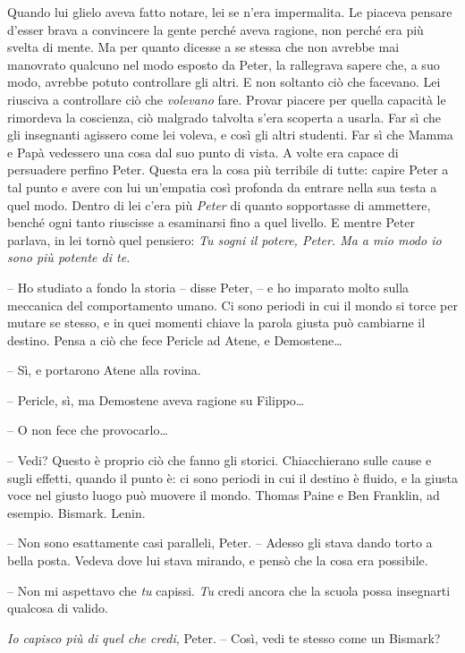 {Quando lui glielo aveva fatto notare, lei se n'era impermalita. Le
	piaceva pensare d'esser brava a convincere la gente perché aveva
	ragione, non perché era più svelta di mente. Ma per quanto dicesse a se
	stessa che non avrebbe mai manovrato qualcuno nel modo esposto da Peter,
	la rallegrava sapere che, a suo modo, avrebbe potuto controllare gli
	altri. E non soltanto ciò che facevano. Lei riusciva a controllare ciò
	che \emph{volevano} fare. Provar piacere per quella capacità le
	rimordeva la coscienza, ciò malgrado talvolta s'era scoperta a usarla.
	Far sì che gli insegnanti agissero come lei voleva, e così gli altri
	studenti. Far sì che Mamma e Papà vedessero una cosa dal suo punto di
	vista. A volte era capace di persuadere perfino Peter. Questa era la
	cosa più terribile di tutte: capire Peter a tal punto e avere con lui
	un'empatia così profonda da entrare nella sua testa a quel modo. Dentro
	di lei c'era più \emph{Peter} di quanto sopportasse di ammettere, benché
	ogni tanto riuscisse a esaminarsi fino a quel livello. E mentre Peter
	parlava, in lei tornò quel pensiero: \emph{Tu sogni il potere, Peter. Ma
		a mio modo io sono più potente di te.}}

{-- Ho studiato a fondo la storia -- disse Peter, -- e ho imparato molto
	sulla meccanica del comportamento umano. Ci sono periodi in cui il mondo
	si torce per mutare se stesso, e in quei momenti chiave la parola giusta
	può cambiarne il destino. Pensa a ciò che fece Pericle ad Atene, e
	Demostene\ldots{}}

{-- Sì, e portarono Atene alla rovina.}

{-- Pericle, sì, ma Demostene aveva ragione su Filippo\ldots{}}

{-- O non fece che provocarlo\ldots{}}

{-- Vedi? Questo è proprio ciò che fanno gli storici. Chiacchierano
	sulle cause e sugli effetti, quando il punto è: ci sono periodi in cui
	il destino è fluido, e la giusta voce nel giusto luogo può muovere il
	mondo. Thomas Paine e Ben Franklin, ad esempio. Bismark. Lenin.}

{-- Non sono esattamente casi paralleli, Peter. -- Adesso gli stava
	dando torto a bella posta. Vedeva dove lui stava mirando, e pensò che la
	cosa era possibile.}

{-- Non mi aspettavo che \emph{tu} capissi. \emph{Tu} credi ancora che
	la scuola possa insegnarti qualcosa di valido.}

\emph{{Io capisco più di quel che credi}}{, \emph{} Peter. -- Così, vedi
	te stesso come un Bismark?}

